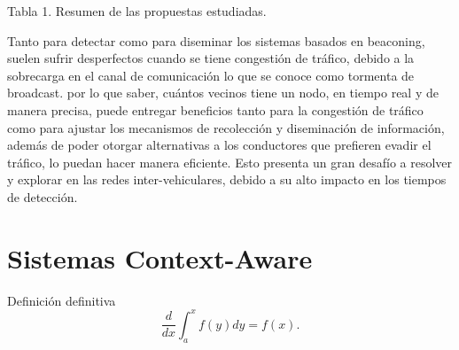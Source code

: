 Tabla 1. Resumen de las propuestas estudiadas.

Tanto para detectar como para diseminar  los sistemas basados en beaconing, suelen sufrir desperfectos cuando se tiene congestión de tráfico, debido a la sobrecarga en el canal de comunicación lo que se conoce como tormenta de broadcast. por lo que saber, cuántos vecinos tiene un nodo, en tiempo real y de manera precisa, puede entregar beneficios tanto para la congestión de tráfico como para ajustar los mecanismos de recolección y diseminación de información, además de poder otorgar alternativas a los conductores que prefieren evadir el tráfico, lo puedan hacer manera eficiente. Esto presenta un gran desafío a resolver y explorar en las redes inter-vehiculares, debido a su alto impacto en los tiempos de detección.

\section{Sistemas Context-Aware}

\begin{defn} Definición definitiva $$\frac{d}{dx}\int_a^xf(y)dy=f(x).$$\end{defn}